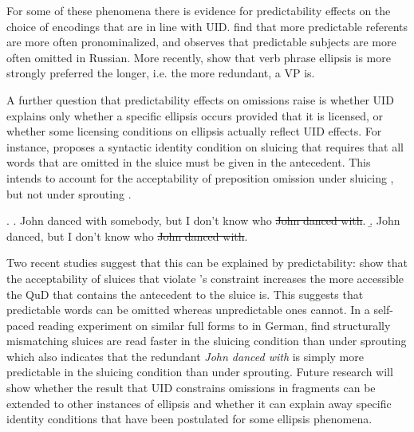 For some of these phenomena there is evidence for predictability effects on the choice of encodings  that are in line with UID. \citet{tily.piantadosi2009} find that more predictable referents are more often pronominalized, and \citet{kravtchenko2014} observes that predictable subjects are more often omitted in Russian. More recently, \citet{schafer.etalunderreview} show that verb phrase ellipsis is more strongly preferred the longer, i.e. the more redundant, a VP is.

A further question that predictability effects on omissions raise is whether UID explains only whether a specific ellipsis occurs provided that it is licensed, or whether some licensing conditions on ellipsis actually reflect UID effects. For instance, \citet{chung2006} proposes a syntactic identity condition on sluicing that requires that all words that are omitted in the sluice must be given in the antecedent. This intends to account for the acceptability of preposition omission under sluicing \Next[a], but not under sprouting \Next[b].

\ex. \a. John danced with somebody, but I don't know who \sout{John danced with}.
     \b. John danced, but I don't know who \sout{John danced with}.

Two recent studies suggest that this can be explained by predictability: \citet{poppels.kehler2019a} show that the acceptability of sluices that violate \citeauthor{chung2006}'s constraint increases the more accessible the QuD that contains the antecedent to the sluice is. This suggests that predictable words can be omitted whereas unpredictable ones cannot. In a self-paced reading experiment on similar full forms to \Last in German, \citet{lemke.etalaccepted} find structurally mismatching sluices are read faster in the sluicing condition than under sprouting which also indicates that the redundant \textit{John danced with} is simply more predictable in the sluicing condition than under sprouting. Future research will show whether the result that UID constrains omissions in fragments can be extended to other instances of ellipsis and whether it can explain away specific identity conditions that have been postulated for some ellipsis phenomena.